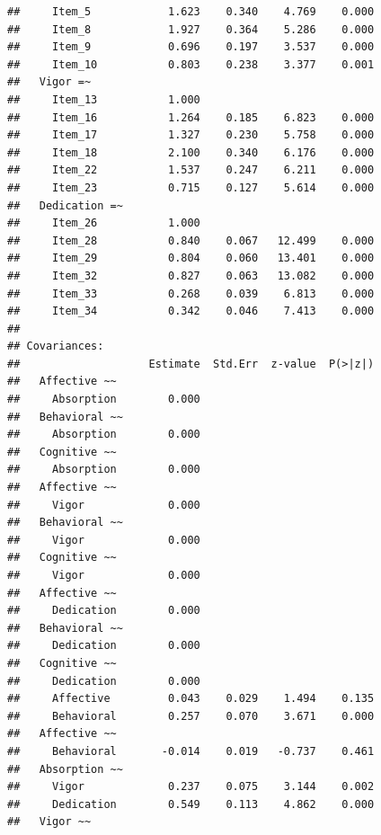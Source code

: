 \documentclass[
]{book}
\begin{document}
\begin{verbatim}
##     Item_5            1.623    0.340    4.769    0.000
##     Item_8            1.927    0.364    5.286    0.000
##     Item_9            0.696    0.197    3.537    0.000
##     Item_10           0.803    0.238    3.377    0.001
##   Vigor =~                                            
##     Item_13           1.000                           
##     Item_16           1.264    0.185    6.823    0.000
##     Item_17           1.327    0.230    5.758    0.000
##     Item_18           2.100    0.340    6.176    0.000
##     Item_22           1.537    0.247    6.211    0.000
##     Item_23           0.715    0.127    5.614    0.000
##   Dedication =~                                       
##     Item_26           1.000                           
##     Item_28           0.840    0.067   12.499    0.000
##     Item_29           0.804    0.060   13.401    0.000
##     Item_32           0.827    0.063   13.082    0.000
##     Item_33           0.268    0.039    6.813    0.000
##     Item_34           0.342    0.046    7.413    0.000
## 
## Covariances:
##                    Estimate  Std.Err  z-value  P(>|z|)
##   Affective ~~                                        
##     Absorption        0.000                           
##   Behavioral ~~                                       
##     Absorption        0.000                           
##   Cognitive ~~                                        
##     Absorption        0.000                           
##   Affective ~~                                        
##     Vigor             0.000                           
##   Behavioral ~~                                       
##     Vigor             0.000                           
##   Cognitive ~~                                        
##     Vigor             0.000                           
##   Affective ~~                                        
##     Dedication        0.000                           
##   Behavioral ~~                                       
##     Dedication        0.000                           
##   Cognitive ~~                                        
##     Dedication        0.000                           
##     Affective         0.043    0.029    1.494    0.135
##     Behavioral        0.257    0.070    3.671    0.000
##   Affective ~~                                        
##     Behavioral       -0.014    0.019   -0.737    0.461
##   Absorption ~~                                       
##     Vigor             0.237    0.075    3.144    0.002
##     Dedication        0.549    0.113    4.862    0.000
##   Vigor ~~                                            

\end{verbatim}
\end{document}
